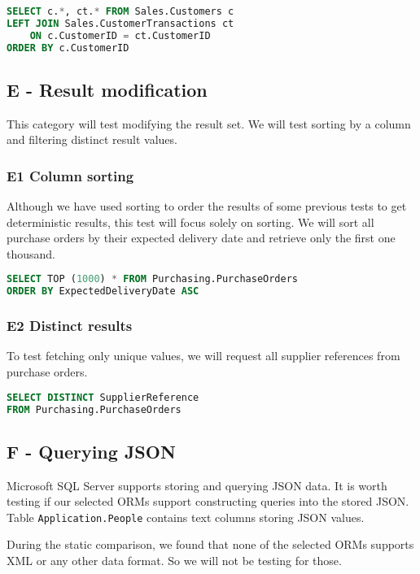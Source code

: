 \begin{lstlisting}[language=SQL]
SELECT c.*, ct.* FROM Sales.Customers c
LEFT JOIN Sales.CustomerTransactions ct
    ON c.CustomerID = ct.CustomerID
ORDER BY c.CustomerID
\end{lstlisting}

\subsection{E - Result modification}
This category will test modifying the result set. We will test sorting by a column and filtering distinct result values.

\subsubsection*{E1 Column sorting}
Although we have used sorting to order the results of some previous tests to get deterministic results, this test will focus solely on sorting.
We will sort all purchase orders by their expected delivery date and retrieve only the first one thousand.

\begin{lstlisting}[language=SQL]
SELECT TOP (1000) * FROM Purchasing.PurchaseOrders 
ORDER BY ExpectedDeliveryDate ASC
\end{lstlisting}

\subsubsection*{E2 Distinct results}
To test fetching only unique values, we will request all supplier references from purchase orders.

\begin{lstlisting}[language=SQL]
SELECT DISTINCT SupplierReference 
FROM Purchasing.PurchaseOrders
\end{lstlisting}

\subsection{F - Querying JSON}
Microsoft SQL Server supports storing and querying JSON data\cite{mssqljson}. It is worth testing if our selected ORMs support constructing queries into the stored JSON.
Table \texttt{Application.People} contains text columns storing JSON values.

During the static comparison, we found that none of the selected ORMs supports XML or any other data format. So we will not be testing for those.

